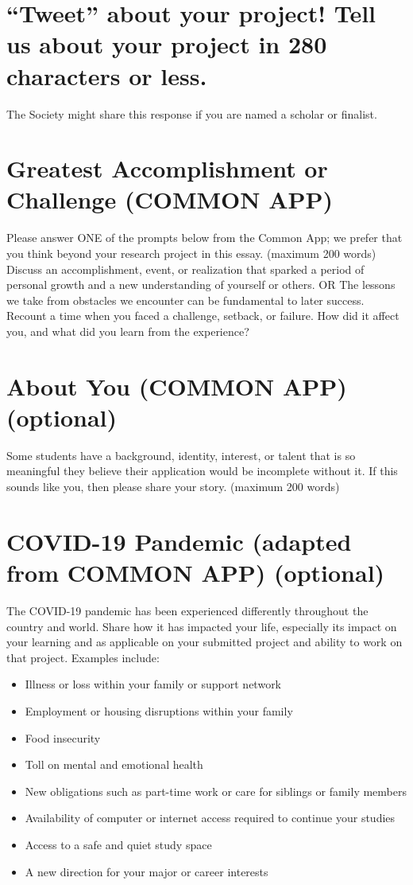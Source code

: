 \documentclass[11pt]{article}
\begin{document}
\section{``Tweet'' about your project! Tell us about your project in 280 characters or less.}
\label{sec:org9998841}
The Society might share this response if you are named a scholar or finalist.

\section{Greatest Accomplishment or Challenge (COMMON APP)}
\label{sec:org228c064}
Please answer ONE of the prompts below from the Common App; we prefer that you think beyond your research project in this essay. (maximum 200 words)
Discuss an accomplishment, event, or realization that sparked a period of personal growth and a new understanding of yourself or others.
OR
The lessons we take from obstacles we encounter can be fundamental to later success. Recount a time when you faced a challenge, setback, or failure. How did it affect you, and what did you learn from the experience?

\section{About You (COMMON APP) (optional)}
\label{sec:orgbad95ff}
Some students have a background, identity, interest, or talent that is so meaningful they believe their application would be incomplete without it. If this sounds like you, then please share your story. (maximum 200 words)

\section{COVID-19 Pandemic (adapted from COMMON APP) (optional)}
\label{sec:org2636bf9}

The COVID-19 pandemic has been experienced differently throughout the country and world. Share how it has impacted your life, especially its impact on your learning and as applicable on your submitted project and ability to work on that project. Examples include:
\begin{itemize}
\item Illness or loss within your family or support network
\item Employment or housing disruptions within your family
\item Food insecurity
\item Toll on mental and emotional health
\item New obligations such as part-time work or care for siblings or family members
\item Availability of computer or internet access required to continue your studies
\item Access to a safe and quiet study space
\item A new direction for your major or career interests
\end{itemize}
\end{document}
